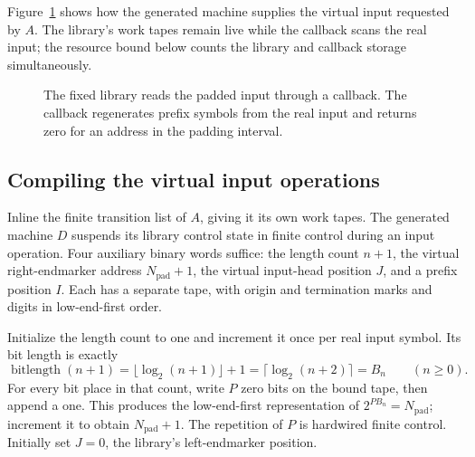 Figure~\ref{fig:compiler-padding} shows how the generated machine supplies
the virtual input requested by $A$. The library's work tapes remain live
while the callback scans the real input; the resource bound below counts
the library and callback storage simultaneously.

\begin{figure}[tb]
 \centering
 
 \caption{The fixed library reads the padded input through a callback.
 The callback regenerates prefix symbols from the real input and returns
 zero for an address in the padding interval.}
 \label{fig:compiler-padding}
\end{figure}

\subsection{Compiling the virtual input operations}
\label{subsec:compiler-callback}

Inline the finite transition list of $A$, giving it its own work tapes.
The generated machine $D$ suspends its library control state in finite
control during an input operation.  Four auxiliary binary words suffice:
the length count $n+1$, the virtual right-endmarker address
$N_{\mathrm{pad}}+1$, the virtual input-head position $J$, and a prefix
position $I$.  Each has a separate tape, with origin and termination
marks and digits in low-end-first order.

Initialize the length count to one and increment it once per real input
symbol.  Its bit length is exactly
\begin{equation}\label{eq:compiler-bitlength}
 \operatorname{bitlength}(n+1)
   =\lfloor\log_2(n+1)\rfloor+1
   =\lceil\log_2(n+2)\rceil=B_n
 \qquad(n\ge0).
\end{equation}
For every bit place in that count, write $P$ zero bits on the bound tape,
then append a one.  This produces the low-end-first representation of
$2^{PB_n}=N_{\mathrm{pad}}$; increment it to obtain
$N_{\mathrm{pad}}+1$.  The repetition of $P$ is hardwired finite control.
Initially set $J=0$, the library's left-endmarker position.

